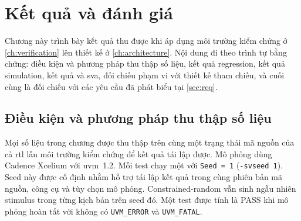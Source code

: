 \chapter{Kết quả và đánh giá}
\label{ch:results}

\newcommand{\WaveformLogs}[4]{%
	\begin{figure}[!htbp]
		\centering
		
		\caption{Kết quả đối chiếu chi tiết giao dịch #3 của \Scoreboard{}.}
		\label{fig:res-log-#4-transaction}
	\end{figure}
	\begin{figure}[!htbp]
		\centering
		
		\caption{Tổng kết \Scoreboard{} và \FunctionalCoverage{} sau \VirtualSequence{} #3.}
		\label{fig:res-log-#4-scoreboard}
	\end{figure}%
}

Chương này trình bày kết quả thu được khi áp dụng môi trường kiểm chứng ở \cref{ch:verification} lên
thiết kế ở \cref{ch:architecture}. Nội dung đi theo trình tự bằng chứng: điều kiện và phương pháp thu thập số liệu,
kết quả regression, kết quả simulation, kết quả \FunctionalCoverage{} và \gls{sva}, đối chiếu phạm vi với thiết kế
tham chiếu, và cuối cùng là đối chiếu với các yêu cầu đã phát biểu tại \cref{sec:req}.

\section{Điều kiện và phương pháp thu thập số liệu}
\label{sec:res-baseline}

Mọi số liệu trong chương được thu thập trên cùng một trạng thái mã nguồn của cả \gls{rtl} lẫn môi trường kiểm
chứng để kết quả tái lập được. Mô phỏng dùng Cadence Xcelium với \gls{uvm}~1.2. Mỗi test chạy một
\VirtualSequence{} với \texttt{Seed = 1} (\texttt{-svseed 1}). Seed này được cố định nhằm hỗ trợ tái lập kết quả trong cùng
phiên bản mã nguồn, công cụ và tùy chọn mô phỏng.
Constrained-random vẫn sinh ngẫu nhiên stimulus trong từng kịch bản trên seed đó. Một test được tính
là PASS khi mô phỏng hoàn tất với không có \texttt{UVM\_ERROR} và \texttt{UVM\_FATAL}.

